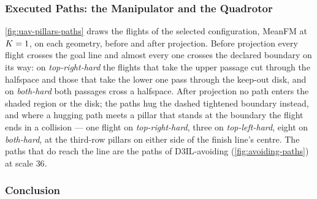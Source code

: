 \FloatBarrier
\subsubsection{Executed Paths: the Manipulator and the Quadrotor}\label{sec:res:uav:pillars:projected}

\autoref{fig:uav-pillars-paths} draws the flights of the selected configuration, MeanFM at $K=1$, on
each geometry, before and after projection. Before projection every flight crosses the goal line and
almost every one crosses the declared boundary on its way: on \emph{top-right-hard} the flights that
take the upper passage cut through the halfspace and those that take the lower one pass through the
keep-out disk, and on \emph{both-hard} both passages cross a halfspace. After projection no path enters
the shaded region or the disk; the paths hug the dashed tightened boundary instead, and where a hugging
path meets a pillar that stands at the boundary the flight ends in a collision --- one flight on
\emph{top-right-hard}, three on \emph{top-left-hard}, eight on \emph{both-hard}, at the third-row pillars
on either side of the finish line's centre. The paths that do reach the line are the paths of
D3IL-avoiding (\autoref{fig:avoiding-paths}) at scale $36$.



\FloatBarrier
\subsubsection{Conclusion}\label{sec:res:uav:pillars:conclusion}

